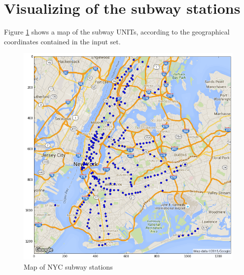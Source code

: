 \documentclass{article}
\begin{document}
\section{Visualizing of the subway stations}

Figure \ref{fig:subway_stations} shows a map of the subway UNITs, according to the geographical coordinates contained in the input set.

\begin{figure}[h]
\centering
\includegraphics[width=\textwidth]{map_stations.png}
\caption{Map of NYC subway stations}
\label{fig:subway_stations}
\end{figure}
\end{document}
